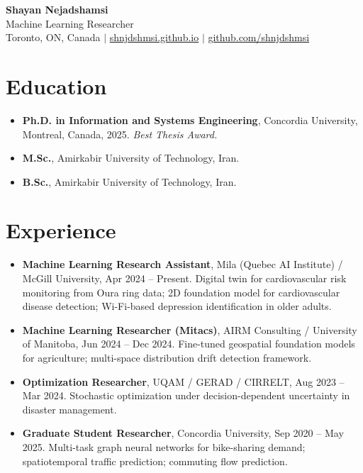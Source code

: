 \documentclass[11pt]{article}
\begin{document}
\begin{center}
    {\LARGE \textbf{Shayan Nejadshamsi}}\\[4pt]
    Machine Learning Researcher \\
    Toronto, ON, Canada \quad $\vert$ \quad
    \href{https://shnjdshmsi.github.io}{shnjdshmsi.github.io} \quad $\vert$ \quad
    \href{https://github.com/shnjdshmsi}{github.com/shnjdshmsi}
\end{center}

\section{Education}
\begin{itemize}
    \item \textbf{Ph.D. in Information and Systems Engineering}, Concordia University, Montreal, Canada, 2025. \emph{Best Thesis Award.}
    \item \textbf{M.Sc.}, Amirkabir University of Technology, Iran.
    \item \textbf{B.Sc.}, Amirkabir University of Technology, Iran.
\end{itemize}

\section{Experience}
\begin{itemize}
    \item \textbf{Machine Learning Research Assistant}, Mila (Quebec AI Institute) / McGill University, Apr 2024 -- Present. Digital twin for cardiovascular risk monitoring from Oura ring data; 2D foundation model for cardiovascular disease detection; Wi-Fi-based depression identification in older adults.
    \item \textbf{Machine Learning Researcher (Mitacs)}, AIRM Consulting / University of Manitoba, Jun 2024 -- Dec 2024. Fine-tuned geospatial foundation models for agriculture; multi-space distribution drift detection framework.
    \item \textbf{Optimization Researcher}, UQAM / GERAD / CIRRELT, Aug 2023 -- Mar 2024. Stochastic optimization under decision-dependent uncertainty in disaster management.
    \item \textbf{Graduate Student Researcher}, Concordia University, Sep 2020 -- May 2025. Multi-task graph neural networks for bike-sharing demand; spatiotemporal traffic prediction; commuting flow prediction.
\end{itemize}
\end{document}
